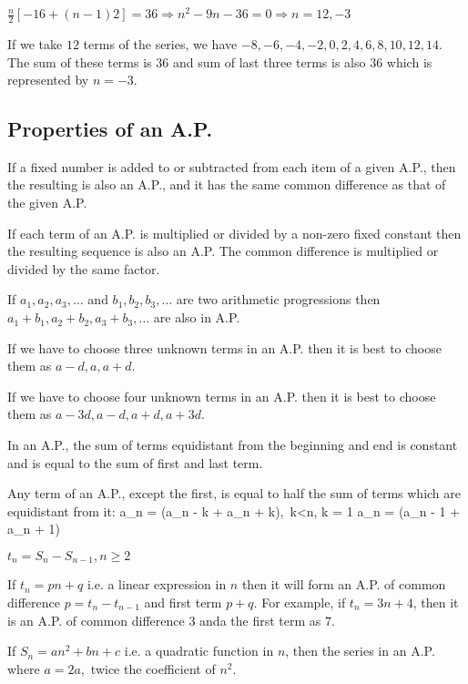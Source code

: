 $\frac{n}{2}[-16 + (n - 1)2] = 36\Rightarrow n^2 - 9n - 36 = 0 \Rightarrow n = 12, -3$

If we take $12$ terms of the series, we have $-8, -6, -4, -2, 0, 2, 4, 6, 8, 10, 12, 14$. The sum of these terms is $36$ and sum of
last three terms is also $36$ which is represented by $n = -3$.

\subsection{Properties of an A.P.}
\startitemize[n]
\item If a fixed number is added to or subtracted from each item of a given A.P., then the resulting is also an A.P., and it has
  the same common difference as that of the given A.P.
\item If each term of an A.P. is multiplied or divided by a non-zero fixed constant then the resulting sequence is also an A.P. The
  common difference is multiplied or divided by the same factor.
\item If $a_1, a_2, a_3, \ldots$ and $b_1, b_2, b_3, \ldots$ are two arithmetic progressions then $a_1 + b_1, a_2 + b_2, a_3 + b_3,
  \ldots$ are also in A.P.
\item If we have to choose three unknown terms in an A.P. then it is best to choose them as $a - d, a, a + d$.
\item If we have to choose four unknown terms in an A.P. then it is best to choose them as $a - 3d, a - d, a + d, a + 3d$.
\item In an A.P., the sum of terms equidistant from the beginning and end is constant and is equal to the sum of first and last
  term.
\item Any term of an A.P., except the first, is equal to half the sum of terms which are equidistant from it:
  \startformula a_n = (a_{n - k} + a_{n + k}), \,k<n, k = 1\stopformula
  \startformula a_n = (a_{n - 1} + a_{n + 1})\stopformula
\item $t_n = S_n - S_{n - 1}, n\geq 2$
\item If $t_n = pn + q$ i.e. a linear expression in $n$ then it will form an A.P. of common difference $p = t_n - t_{n - 1}$ and
  first term $p + q$. For example, if $t_n = 3n + 4$, then it is an A.P. of common difference $3$ anda the first term as $7$.
\item If $S_n = an^2 + bn + c$ i.e. a quadratic function in $n$, then the series in an A.P. where $a = 2a,$ twice the coefficient
  of $n^2$.
\stopitemize

